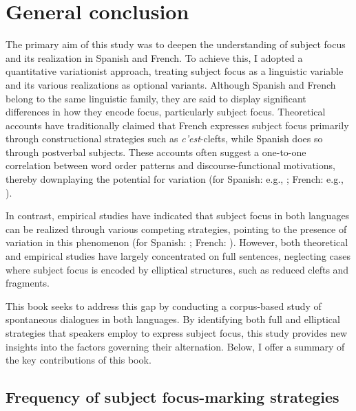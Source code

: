 \chapter{General conclusion}
The primary aim of this study was to deepen the understanding of subject focus and its realization in Spanish and French. To achieve this, I adopted a quantitative variationist approach, treating subject focus as a linguistic variable and its various realizations as optional variants. Although Spanish and French belong to the same linguistic family, they are said to display significant differences in how they encode focus, particularly subject focus. Theoretical accounts have traditionally claimed that French expresses subject focus primarily through constructional strategies such as \textit{c'est}-clefts, while Spanish does so through postverbal subjects. These accounts often suggest a one-to-one correlation between word order patterns and discourse-functional motivations, thereby downplaying the potential for variation (for Spanish: e.g., \cite{zubizarreta1998prosody, costa2001postverbal, samek2001crosslinguistic, gutierrez2013structural}; French: e.g., \cite{prince1978comparison, lambrecht1996information, belletti2005answering}).

In contrast, empirical studies have indicated that subject focus in both languages can be realized through various competing strategies, pointing to the presence of variation in this phenomenon (for Spanish: \cite{gabriel2007fokus, gabriel2010focus, heidinger2013information, uth2014spanish, cabrera1999funciones, feldhausen2015oraciones}; French: \cite{dufter2009focus, fery2001focus, choi2005gens, lahousse2006, Lahousse2011, karssenberg2017oiseaux, Karssenberg+2018}). However, both theoretical and empirical studies have largely concentrated on full sentences, neglecting cases where subject focus is encoded by elliptical structures, such as reduced clefts and fragments.

This book seeks to address this gap by conducting a corpus-based study of spontaneous dialogues in both languages. By identifying both full and elliptical strategies that speakers employ to express subject focus, this study provides new insights into the factors governing their alternation. Below, I offer a summary of the key contributions of this book.

\section{Frequency of subject focus-marking strategies} \label{sub:8.1} %


